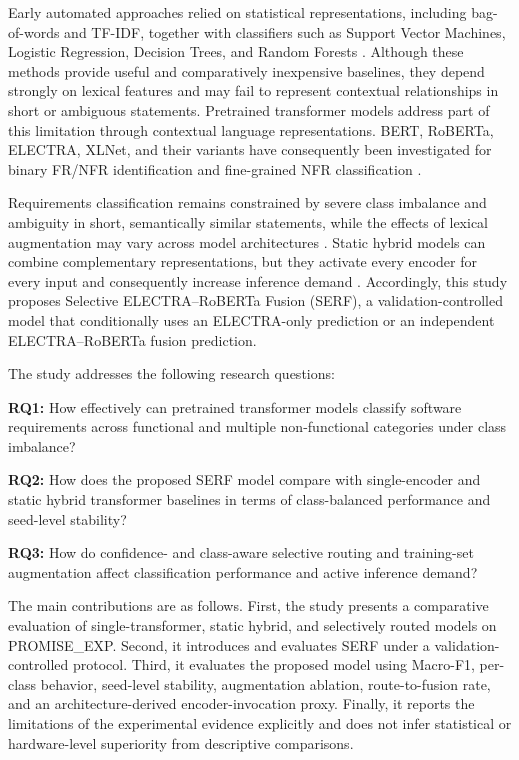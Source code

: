 \documentclass[runningheads]{llncs}
\begin{document}
Early automated approaches relied on statistical representations, including bag-of-words and TF-IDF, together with classifiers such as Support Vector Machines, Logistic Regression, Decision Trees, and Random Forests \cite{shreda_nfr_nlp,idate_ml_requirements}. Although these methods provide useful and comparatively inexpensive baselines, they depend strongly on lexical features and may fail to represent contextual relationships in short or ambiguous statements. Pretrained transformer models address part of this limitation through contextual language representations. BERT, RoBERTa, ELECTRA, XLNet, and their variants have consequently been investigated for binary FR/NFR identification and fine-grained NFR classification \cite{kaur_ai_requirements,khan_transfer_requirements,shafikuzzaman_fewshot_requirements}.

Requirements classification remains constrained by severe class imbalance and ambiguity in short, semantically similar statements, while the effects of lexical augmentation may vary across model architectures \cite{lima_promise_exp,said_functional_nonfunctional,wei_eda}. Static hybrid models can combine complementary representations, but they activate every encoder for every input and consequently increase inference demand \cite{said_functional_nonfunctional}. Accordingly, this study proposes Selective ELECTRA--RoBERTa Fusion (SERF), a validation-controlled model that conditionally uses an ELECTRA-only prediction or an independent ELECTRA--RoBERTa fusion prediction.

The study addresses the following research questions:

\textbf{RQ1:} How effectively can pretrained transformer models classify software requirements across functional and multiple non-functional categories under class imbalance?

\textbf{RQ2:} How does the proposed SERF model compare with single-encoder and static hybrid transformer baselines in terms of class-balanced performance and seed-level stability?

\textbf{RQ3:} How do confidence- and class-aware selective routing and training-set augmentation affect classification performance and active inference demand?

The main contributions are as follows. First, the study presents a comparative evaluation of single-transformer, static hybrid, and selectively routed models on PROMISE\_EXP. Second, it introduces and evaluates SERF under a validation-controlled protocol. Third, it evaluates the proposed model using Macro-F1, per-class behavior, seed-level stability, augmentation ablation, route-to-fusion rate, and an architecture-derived encoder-invocation proxy. Finally, it reports the limitations of the experimental evidence explicitly and does not infer statistical or hardware-level superiority from descriptive comparisons.
\end{document}
